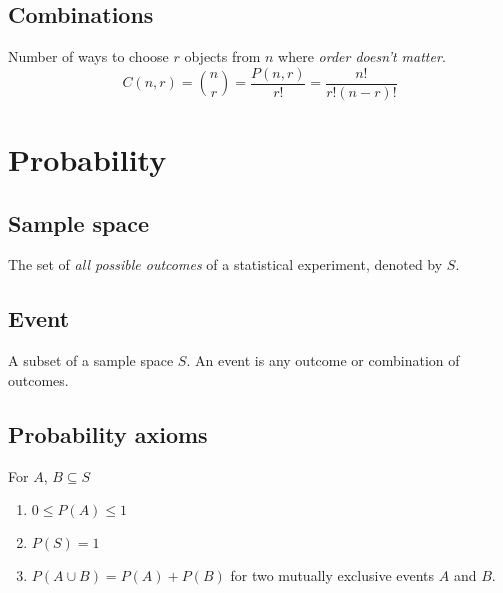 \documentclass{article}
\begin{document}
\subsection{Combinations}
    \begin{definition}
        Number of ways to choose $r$ objects from $n$ where \emph{order doesn't matter}. 
        \begin{equation}
            C(n,r) = \binom{n}{r} = \frac{P(n,r)}{r!} = \frac{n!}{r!(n-r)!}
        \end{equation}
    \end{definition}

\newpage

\section{Probability}
\subsection{Sample space}
    \begin{definition}
        The set of \emph{all possible outcomes} of a statistical experiment, denoted by $S$.
    \end{definition}

\subsection{Event}
    \begin{definition}
        A subset of a sample space $S$. An event is any outcome or combination of outcomes.
    \end{definition}

\subsection{Probability axioms}
    \begin{definition}
        For $A$, $B \subseteq S$
        \begin{enumerate}
            \item $0 \leq P(A) \leq 1$
            \item $P(S) = 1$
            \item $P(A \cup B) = P(A) + P(B)$ for two mutually exclusive events $A$ and $B$. 
        \end{enumerate}
    \end{definition}
\end{document}
